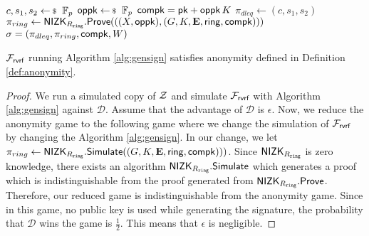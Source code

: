 %	

\begin{algorithm}
	\caption{$\gen_{sign}(\ring,W,\pk,m)$}
	\label{alg:gensign}	 	
	\begin{algorithmic}[1]
		\State $ c,s_1, s_2 \leftsample \FF_p $
		\State $ \openpk \leftsample \FF_p $
		\State $ \mathsf{compk} =  \mathsf{pk} + \mathsf{oppk} \, K$
		\State $ \pi_{dleq}  \leftarrow (c,s_1, s_2)$
		\State $ \pi_{ring} \leftarrow {\ensuremath{\mathsf{NIZK}}}_{R_{\mathtt{ring}}}.{\mathsf{Prove}}(((X, \mathsf{oppk}),(G,K,{\mathbf{E}},\mathsf{ring}, \mathsf{compk}))) $ 
		\State\Return$ \sigma = (\pi_{dleq},\pi_{ring},\mathsf{compk},W) $
	\end{algorithmic}
	
\end{algorithm}


\begin{lemma} $ \mathcal{F}_{\textsf{rvrf}} $ running Algorithm \ref{alg:gensign} satisfies anonymity defined in Definition \ref{def:anonymity}.
\end{lemma}

\begin{proof}
	We run a simulated copy of $ \mathcal{Z} $ and simulate $ \mathcal{F}_{\textsf{rvrf}} $ with Algorithm \ref{alg:gensign} against $ \mathcal{D} $. Assume that the advantage of $ \mathcal{D} $ is $ \epsilon $. Now, we reduce the anonymity game to the following game where we change the simulation of $ \mathcal{F}_{\textsf{rvrf}} $ by changing the Algorithm \ref{alg:gensign}. In our change, we let $ \pi_{ring} \leftarrow {\ensuremath{\mathsf{NIZK}}}_{R_{\mathtt{ring}}}.\mathsf{Simulate}((G,K,{\mathbf{E}},\mathsf{ring}, \mathsf{compk}))) $. Since $ {\mathsf{NIZK}}_{R_{\mathtt{ring}}} $ is zero knowledge, there exists an algorithm  $ {\mathsf{NIZK}}_{R_{\mathtt{ring}}}.\mathsf{Simulate} $ which generates a proof which is indistinguishable from the proof generated from $ {\mathsf{NIZK}}_{R_{\mathtt{ring}}}.{\mathsf{Prove}} $. Therefore, our reduced game is indistinguishable from the anonymity game. Since in this game, no public key is used while generating the signature, the probability that  $ \mathcal{D} $ wins the game is $ \frac{1}{2} $. This means that $ \epsilon $ is negligible.		
\end{proof}

